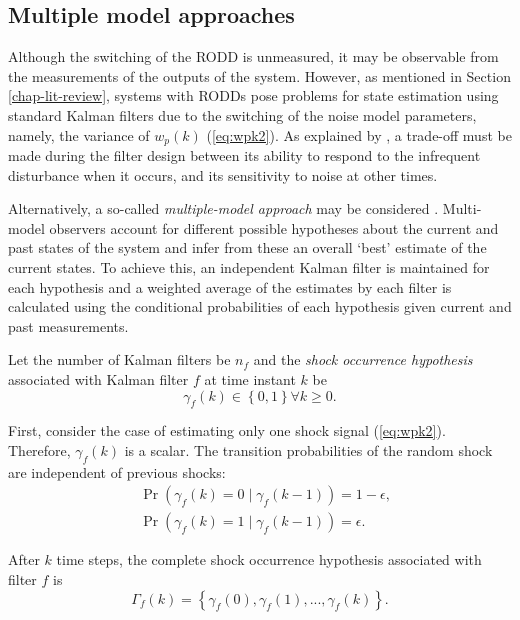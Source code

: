 \subsection{Multiple model approaches}

Although the switching of the RODD is unmeasured, it may be observable from the measurements of the outputs of the system. However, as mentioned in Section \ref{chap-lit-review}, systems with RODDs pose problems for state estimation using standard Kalman filters due to the switching of the noise model parameters, namely, the variance of $w_p(k)$ (\ref{eq:wpk2}). As explained by \cite{robertson_detection_1995}, a trade-off must be made during the filter design between its ability to respond to the infrequent disturbance when it occurs, and its sensitivity to noise at other times.

Alternatively, a so-called \textit{multiple-model approach} may be considered \citep{buxbaum_recursive_1970, jaffer_estimation_1971}. Multi-model observers account for different possible hypotheses about the current and past states of the system and infer from these an overall `best' estimate of the current states. To achieve this, an independent Kalman filter is maintained for each hypothesis and a weighted average of the estimates by each filter is calculated using the conditional probabilities of each hypothesis given current and past measurements.

Let the number of Kalman filters be $n_f$ and the \textit{shock occurrence hypothesis} associated with Kalman filter $f$ at time instant $k$ be
\begin{equation} \label{eq:gammak}
	\gamma_{f}(k) \in \left\{0, 1 \right\} \forall{k \ge 0}.
\end{equation}

First, consider the case of estimating only one shock signal (\ref{eq:wpk2}). Therefore, $\gamma_{f}(k)$ is a scalar. The transition probabilities of the random shock are independent of previous shocks:
\begin{equation} \label{eq:Pr_gammak_given_gammakm1}
	\begin{aligned}
		& \Pr\left(\gamma_{f}(k)=0 \mid \gamma_{f}(k-1)\right) = 1-\epsilon, \\
		& \Pr\left(\gamma_{f}(k)=1 \mid \gamma_{f}(k-1)\right) = \epsilon.
	\end{aligned}
\end{equation}

After $k$ time steps, the complete shock occurrence hypothesis associated with filter $f$ is
\begin{equation} \label{eq:Gammak}
	\Gamma_f(k) = \left\{\gamma_f(0), \gamma_f(1), ..., \gamma_f(k) \right\}.
\end{equation}

